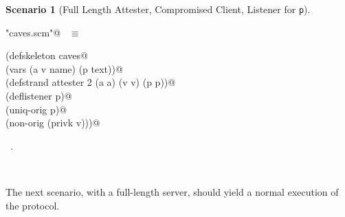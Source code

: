 \documentclass[titlepage,12pt]{article}
\theoremstyle{definition}
\newtheorem{scenario}{Scenario}
\begin{document}
\begin{scenario}[Full Length Attester,
Compromised Client, Listener for \texttt{p}]
\begin{flushleft} \small
\begin{minipage}{\linewidth} \label{scrap29}
\verb@"caves.scm"@\nobreak\ {\footnotesize {} }$\equiv$
\vspace{-1ex}
\begin{list}{}{} \item
\mbox{}\verb@(defskeleton caves@\\
\mbox{}\verb@  (vars (a v name) (p text))@\\
\mbox{}\verb@  (defstrand attester 2 (a a) (v v) (p p))@\\
\mbox{}\verb@  (deflistener p)@\\
\mbox{}\verb@  (uniq-orig p)@\\
\mbox{}\verb@  (non-orig (privk v)))@{\NWsep}
\end{list}
\vspace{-1ex}
\footnotesize\addtolength{\baselineskip}{-1ex}
\begin{list}{}{\setlength{\itemsep}{-\parsep}\setlength{\itemindent}{-\leftmargin}}
\item \NWtxtFileDefBy\ .
\end{list}
\end{minipage}\\[4ex]
\end{flushleft}
\end{scenario}

The next scenario, with a full-length server, should yield a
normal execution of the protocol.
\end{document}
